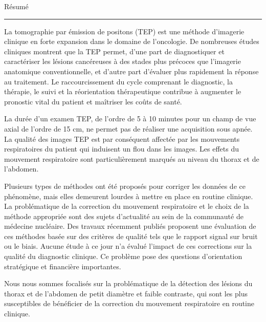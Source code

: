 {\fontsize{30}{100}\selectfont Résumé}

\rule{15cm}{0.1em}

\vspace{1cm}

\thispagestyle{plain}

La tomographie par émission de positons (TEP) est une méthode d’imagerie clinique en forte expansion dans le domaine de l’oncologie. De nombreuses études cliniques montrent que la TEP permet, d’une part de diagnostiquer et caractériser les lésions cancéreuses à des stades plus précoces que l’imagerie anatomique conventionnelle, et d’autre part d’évaluer plus rapidement la réponse au traitement. Le raccourcissement du cycle comprenant le diagnostic, la thérapie, le suivi et la réorientation thérapeutique contribue à augmenter le pronostic vital du patient et maîtriser les coûts de santé.

La durée d’un examen TEP, de l’ordre de 5 à 10 minutes pour un champ de vue axial de l’ordre de 15 cm, ne permet pas de réaliser une acquisition sous apnée. La qualité des images TEP est par conséquent affectée par les mouvements respiratoires du patient qui induisent un flou dans les images. Les effets du mouvement respiratoire sont particulièrement marqués au niveau du thorax et de l’abdomen.

Plusieurs types de méthodes ont été proposés pour corriger les données de ce phénomène, mais elles demeurent lourdes à mettre en place en routine clinique. La problématique de la correction du mouvement respiratoire et le choix de la méthode appropriée sont des sujets d’actualité au sein de la communauté de médecine nucléaire. Des travaux récemment publiés proposent une évaluation de ces méthodes basée sur des critères de qualité tels que le rapport signal sur bruit ou le biais. Aucune étude à ce jour n’a évalué l’impact de ces corrections sur la qualité du diagnostic clinique. Ce problème pose des questions d’orientation stratégique et financière importantes.

Nous nous sommes focalisés sur la problématique de la détection des lésions du thorax et de l'abdomen de petit diamètre et faible contraste, qui sont les plus susceptibles de  bénéficier de la correction du mouvement respiratoire en routine clinique.

